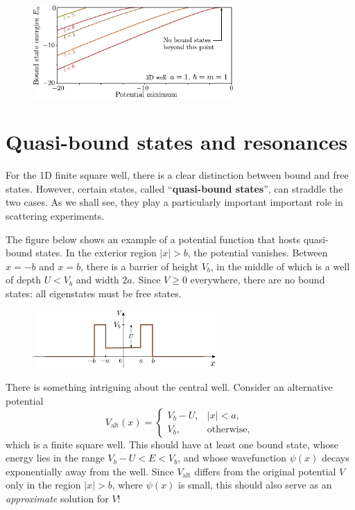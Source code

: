 \documentclass[prx,12pt]{revtex4-2}
\begin{document}
\vskip 0.15in
\begin{figure}[h]
  \centering\includegraphics[width=0.68\textwidth]{boundstate3d}
\end{figure}

\section{Quasi-bound states and resonances}
\label{sec:resonances}

For the 1D finite square well, there is a clear distinction between
bound and free states.  However, certain states, called
``\textbf{quasi-bound states}'', can straddle the two cases.  As we
shall see, they play a particularly important important role in
scattering experiments.

The figure below shows an example of a potential function that hosts
quasi-bound states.  In the exterior region $|x| > b$, the potential
vanishes.  Between $x = -b$ and $x = b$, there is a barrier of height
$V_b$, in the middle of which is a well of depth $U < V_b$ and width
$2a$.  Since $V \ge 0$ everywhere, there are no bound states: all
eigenstates must be free states.

\begin{figure}[h]
  \centering\includegraphics[width=0.62\textwidth]{resonancewell}
\end{figure}

There is something intriguing about the central well.  Consider an
alternative potential
\begin{equation}
  V_{\mathrm{alt}}(x) = \begin{cases}V_b - U, & |x| < a, \\ V_b, & \mathrm{otherwise},\end{cases}
\end{equation}
which is a finite square well.  This should have at least one bound
state, whose energy lies in the range $V_b-U < E < V_b$, and whose
wavefunction $\psi(x)$ decays exponentially away from the well.  Since
$V_{\mathrm{alt}}$ differs from the original potential $V$ only in the
region $|x| > b$, where $\psi(x)$ is small, this should also serve as
an \textit{approximate} solution for $V$!
\end{document}

